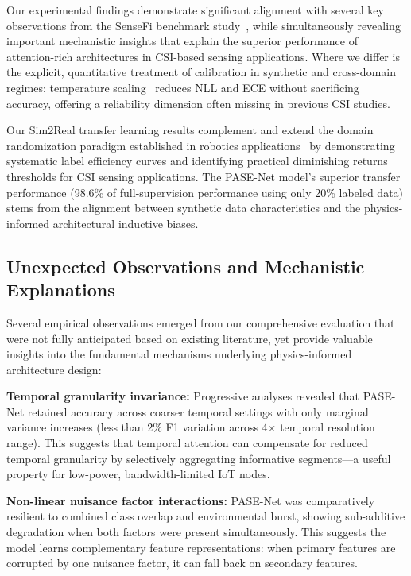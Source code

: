 \documentclass[lettersize,journal]{IEEEtran}
\begin{document}
Our experimental findings demonstrate significant alignment with several key observations from the SenseFi benchmark study~\cite{yang2023sensefi}, while simultaneously revealing important mechanistic insights that explain the superior performance of attention-rich architectures in CSI-based sensing applications. Where we differ is the explicit, quantitative treatment of calibration in synthetic and cross-domain regimes: temperature scaling~\cite{calibration_guo2017} reduces NLL and ECE without sacrificing accuracy, offering a reliability dimension often missing in previous CSI studies.

Our Sim2Real transfer learning results complement and extend the domain randomization paradigm established in robotics applications~\cite{peng2018sim2real} by demonstrating systematic label efficiency curves and identifying practical diminishing returns thresholds for CSI sensing applications. The PASE-Net model's superior transfer performance (98.6\% of full-supervision performance using only 20\% labeled data) stems from the alignment between synthetic data characteristics and the physics-informed architectural inductive biases.

\subsection{Unexpected Observations and Mechanistic Explanations}

Several empirical observations emerged from our comprehensive evaluation that were not fully anticipated based on existing literature, yet provide valuable insights into the fundamental mechanisms underlying physics-informed architecture design:

\textbf{Temporal granularity invariance:} Progressive analyses revealed that PASE-Net retained accuracy across coarser temporal settings with only marginal variance increases (less than 2\% F1 variation across 4× temporal resolution range). This suggests that temporal attention can compensate for reduced temporal granularity by selectively aggregating informative segments—a useful property for low-power, bandwidth-limited IoT nodes.

\textbf{Non-linear nuisance factor interactions:} PASE-Net was comparatively resilient to combined class overlap and environmental burst, showing sub-additive degradation when both factors were present simultaneously. This suggests the model learns complementary feature representations: when primary features are corrupted by one nuisance factor, it can fall back on secondary features.
\end{document}
